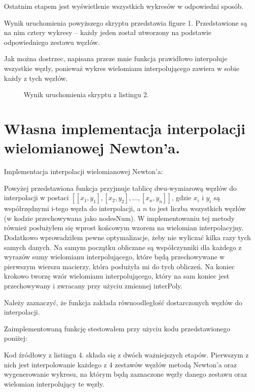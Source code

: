 \documentclass[a4paper,oneside,11pt]{report}
\begin{document}
Ostatnim etapem jest wyświetlenie wszystkich wykresów w odpowiedni sposób.

Wynik uruchomienia powyższego skryptu przedstawia figure 1. Przedstawione są na nim cztery wykresy – każdy jeden został utworzony na podstawie odpowiedniego zestawu węzłów.

Jak można dostrzec, napisana przeze mnie funkcja prawidłowo interpoluje wszystkie węzły, ponieważ wykres wielomianu interpolującego zawiera w sobie każdy z tych węzłów.

\begin{figure}[htp] 
\caption{Wynik uruchomienia skryptu z listingu 2.}
\end{figure}
\newpage
\section{Własna implementacja interpolacji wielomianowej Newton’a.}
Implementacja interpolacji wielomianowej Newton’a:


Powyżej przedstawiona funkcja przyjmuje tablicę dwu-wymiarową węzłów do interpolacji w postaci $[[x_1 , y_1 ], [x_2 , y_2 ], ..., [x_n , y_n ]]$, gdzie $x_i$ i $y_i$ są współrzędnymi i-tego węzła do interpolacji, a $n$ to jest liczba wszystkich węzłów (w kodzie przechowywana jako nodesNum). W implementowaniu tej metody również posłużyłem się wprost końcowym wzorem na wielomian interpolacyjny. Dodatkowo wprowadziłem pewne optymalizacje, żeby nie wyliczać kilka razy tych samych danych. Na samym początku obliczane są współczynniki dla każdego z wyrazów sumy wielomianu interpolującego, które będą przechowywane w pierwszym wierszu macierzy, która posłużyła mi do tych obliczeń. Na koniec krokowo tworzę wzór wielomianu interpolującego, który na sam koniec jest przechowywany i zwracany przy użyciu zmiennej interPoly.

Należy zaznaczyć, że funkcja zakłada równoodległość dostarczonych węzłów do interpolacji.

Zaimplementowaną funkcję stestowałem przy użyciu kodu przedstawionego poniżej:


Kod źródłowy z listingu 4. składa się z dwóch ważniejszych etapów. Pierwszym z nich jest interpolowanie każdego z 4 zestawów węzłów metodą Newton’a oraz wygenerowanie wykresu, na którym będą zaznaczone węzły danego zestawu oraz wielomian interpolujący te węzły.
\end{document}
